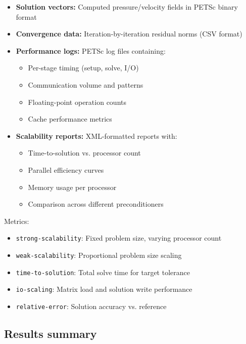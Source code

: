 \begin{itemize}
\item \textbf{Solution vectors:} Computed pressure/velocity fields in PETSc binary format

\item \textbf{Convergence data:} Iteration-by-iteration residual norms (CSV format)

\item \textbf{Performance logs:} PETSc log files containing:
  \begin{itemize}
  \item Per-stage timing (setup, solve, I/O)
  \item Communication volume and patterns
  \item Floating-point operation counts
  \item Cache performance metrics
  \end{itemize}

\item \textbf{Scalability reports:} XML-formatted reports with:
  \begin{itemize}
  \item Time-to-solution vs. processor count
  \item Parallel efficiency curves
  \item Memory usage per processor
  \item Comparison across different preconditioners
  \end{itemize}
\end{itemize}

Metrics:
\begin{itemize}
    \item \texttt{strong-scalability}: Fixed problem size, varying processor count
    \item \texttt{weak-scalability}: Proportional problem size scaling
    \item \texttt{time-to-solution}: Total solve time for target tolerance
    \item \texttt{io-scaling}: Matrix load and solution write performance
    \item \texttt{relative-error}: Solution accuracy vs. reference
\end{itemize}



\subsection{Results summary}


